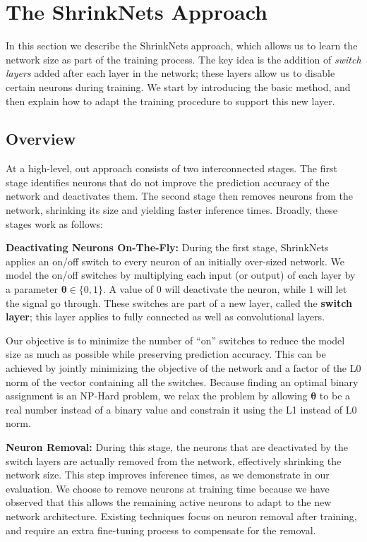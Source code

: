 
\section{The ShrinkNets Approach}

In this section we describe the ShrinkNets approach, which allows us to learn
the network size as part of the training process. The key idea is the addition
of \emph{switch layers} added after each layer in the network;  these layers
allow us to disable certain neurons during training.  We start by introducing the
basic method, and then explain how to adapt the training procedure to support this new
layer. 

\subsection{Overview}

At a high-level, out approach consists of two interconnected stages.
The first stage identifies neurons that do not improve the
prediction accuracy of the network and deactivates them. The second stage then
removes neurons from the network, shrinking its
size and yielding faster inference times. Broadly, these stages work as follows:

\noindent\textbf{Deactivating Neurons On-The-Fly: }During the first stage,
ShrinkNets applies an on/off switch to every neuron of an initially over-sized
network. We model the on/off switches by multiplying each input (or output) of
each layer by a parameter $\bm{\theta}\in\{0,1\}$. A value of $0$
will deactivate the neuron, while $1$ will let the signal go through. These
switches are part of a new layer, called the \textbf{switch layer}; this layer applies 
to fully connected as well as convolutional layers.

Our objective is to minimize the number of ``on'' switches to reduce the model size as much
as possible while preserving prediction accuracy. This can be achieved by jointly
minimizing the objective of the network and a factor of the L0 norm of the
vector containing all the switches. Because finding an optimal binary
assignment is an NP-Hard problem, we relax the problem by allowing
 $\bm{\theta}$ to be a real number
instead of a binary value and constrain it using the L1 instead of L0 norm.

\noindent\textbf{Neuron Removal: } During this stage, the neurons that are
deactivated by the switch layers are actually removed from the network,
effectively shrinking the network size. This step improves inference
times, as we demonstrate in our evaluation. We choose to remove neurons at
training time because we have observed that this allows the remaining active neurons to adapt
to the new network architecture. Existing techniques focus on neuron removal
after training, and require an extra fine-tuning process to compensate for the
removal.

